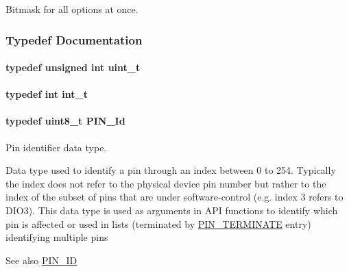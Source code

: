 Bitmask for all options at once. 



\subsubsection{Typedef Documentation}
\paragraph[{uint\+\_\+t}]{\setlength{\rightskip}{0pt plus 5cm}typedef unsigned int {\bf uint\+\_\+t}}\label{_p_i_n_8h_a12a1e9b3ce141648783a82445d02b58d}
\paragraph[{int\+\_\+t}]{\setlength{\rightskip}{0pt plus 5cm}typedef int {\bf int\+\_\+t}}\label{_p_i_n_8h_ab6fd6105e64ed14a0c9281326f05e623}
\paragraph[{P\+I\+N\+\_\+\+Id}]{\setlength{\rightskip}{0pt plus 5cm}typedef uint8\+\_\+t {\bf P\+I\+N\+\_\+\+Id}}\label{_p_i_n_8h_a9ae8197f460bb76ea09a84f47d09921f}


Pin identifier data type. 

Data type used to identify a pin through an index between 0 to 254. Typically the index does not refer to the physical device pin number but rather to the index of the subset of pins that are under software-\/control (e.\+g. index 3 refers to D\+I\+O3). This data type is used as arguments in A\+P\+I functions to identify which pin is affected or used in lists (terminated by \hyperlink{_p_i_n_8h_ae22ec44ad92ee130a665ca56aad38c75}{P\+I\+N\+\_\+\+T\+E\+R\+M\+I\+N\+A\+T\+E} entry) identifying multiple pins \begin{DoxySeeAlso}{See also}
\hyperlink{_p_i_n_8h_add47c82f7563d28053f76d368d344bc6}{P\+I\+N\+\_\+\+I\+D} 
\end{DoxySeeAlso}
